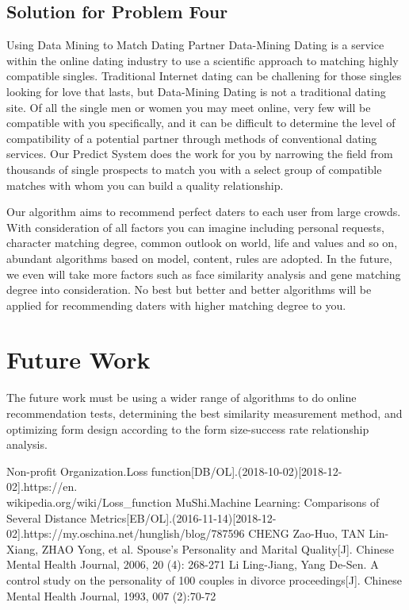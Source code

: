 \subsection{Solution for Problem Four}
Using Data Mining to Match Dating Partner
Data-Mining Dating is a service within the online dating industry to use a scientific approach to matching highly compatible singles. 
Traditional Internet dating can be challening for those singles looking for love that lasts, but Data-Mining Dating is not a traditional dating site. Of all the single men or women you may meet online, very few will be compatible with you specifically, and it can be difficult to determine the level of compatibility of a potential partner through methods of conventional dating services. Our Predict System does the work for you  by narrowing the field from thousands of single prospects to match you with a select group of compatible matches with whom you can build a quality relationship. \par
Our algorithm aims to recommend perfect daters to each user from large crowds. With consideration of all factors you can imagine including personal requests, character matching degree, common outlook on world, life and values and so on, abundant algorithms based on model, content, rules are adopted. In the future, we even will take more factors such as face similarity analysis and gene matching degree into consideration. No best but better and better algorithms will be applied for recommending daters with higher matching degree to you. 

\section{Future Work}
The future work must be using a wider range of algorithms to do online recommendation tests, determining the best  similarity measurement method, and optimizing form design according to the form size-success rate relationship analysis.

\begin{thebibliography}{99}      
	 Non-profit Organization.Loss function[DB/OL].(2018-10-02)[2018-12-02].https://en.  \\ wikipedia.org/wiki/Loss\_function    
	 MuShi.Machine Learning: Comparisons of Several Distance Metrics[EB/OL].(2016-11-14)[2018-12-02].https://my.oschina.net/hunglish/blog/787596     
	  CHENG Zao-Huo, TAN Lin-Xiang, ZHAO Yong, et al. Spouse's Personality and Marital Quality[J]. Chinese Mental Health Journal, 2006, 20 (4): 268-271
	 Li Ling-Jiang, Yang De-Sen. A control study on the personality of 100 couples in divorce proceedings[J]. Chinese Mental Health Journal, 1993, 007 (2):70-72
\end{thebibliography}


